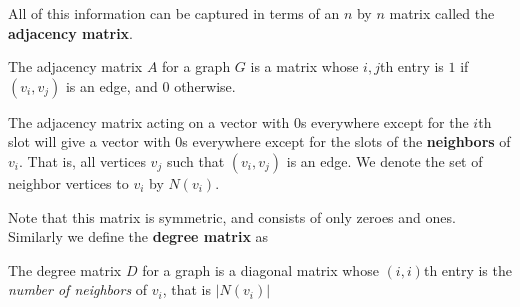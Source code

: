 	All of this information can be captured in terms of an $n$ by $n$ matrix called the \textbf{adjacency matrix}. 
	\begin{defn}
		The adjacency matrix $A$ for a graph $G$ is a matrix whose $i,j$th entry is $1$ if $(v_i,v_j)$ is an edge, and $0$ otherwise.
	\end{defn}
	The adjacency matrix acting on a vector with $0$s everywhere except for the $i$th slot will give a vector with $0$s everywhere except for the slots of the \textbf{neighbors} of $v_i$. That is, all vertices $v_j$ such that $(v_i, v_j)$ is an edge. We denote the set of neighbor vertices to $v_i$ by $N(v_i)$.
	
	Note that this matrix is symmetric, and consists of only zeroes and ones. Similarly we define the \textbf{degree matrix} as
	\begin{defn}
		The degree matrix $D$ for a graph is a diagonal matrix whose $(i,i)$th entry is the \emph{number of neighbors} of $v_i$, that is $|N(v_i)|$
	\end{defn}
	
